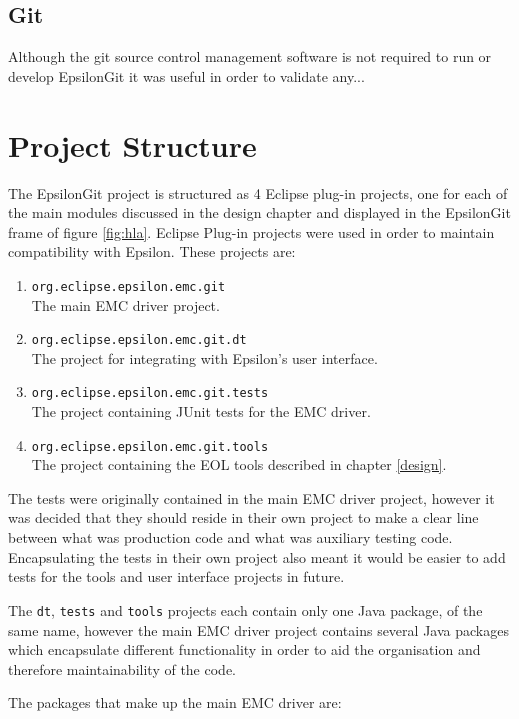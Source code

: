 \documentclass[11pt]{book}
\newcommand{\code}[1]{\texttt{#1}}
\begin{document}
\subsection{Git}
Although the git source control management software is not required to run or develop EpsilonGit it was useful in order to validate any... %

\section{Project Structure}
The EpsilonGit project is structured as 4 Eclipse plug-in projects, one for each of the main modules discussed in the design chapter and displayed in the EpsilonGit frame of figure \ref{fig:hla}. Eclipse Plug-in projects were used in order to maintain compatibility with Epsilon. These projects are:

\begin{enumerate}
	\item \code{org.eclipse.epsilon.emc.git} \\ The main EMC driver project.
	\item \code{org.eclipse.epsilon.emc.git.dt} \\ The project for integrating with Epsilon's user interface.
	\item \code{org.eclipse.epsilon.emc.git.tests} \\ The project containing JUnit tests for the EMC driver.
	\item \code{org.eclipse.epsilon.emc.git.tools} \\ The project containing the EOL tools described in chapter \ref{design}.
\end{enumerate}

The tests were originally contained in the main EMC driver project, however it was decided that they should reside in their own project to make a clear line between what was production code and what was auxiliary testing code. Encapsulating the tests in their own project also meant it would be easier to add tests for the tools and user interface projects in future.

The \code{dt}, \code{tests} and \code{tools} projects each contain only one Java package, of the same name, however the main EMC driver project contains several Java packages which encapsulate different functionality in order to aid the organisation and therefore maintainability of the code.

\clearpage

The packages that make up the main EMC driver are:
\end{document}

